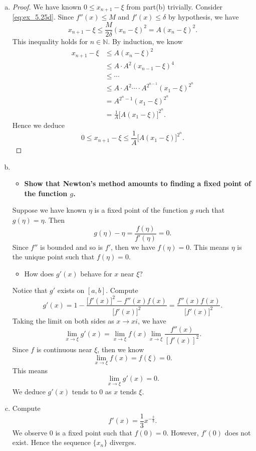 \begin{Exercise}
\begin{enumerate}[(a)]
		\item
		\begin{proof}
			We have known $0 \leq x_{n+1} - \xi$ from part(b) trivially.
			Consider \eqref{eq:ex_5.25d}.
			Since $f''(x) \leq M$ and $f'(x) \leq \delta$ by hypothesis, we have
			$$
			x_{n+1}-\xi \leq \frac{M}{2\delta}(x_n-\xi)^2 = A(x_n-\xi)^2.
			$$
			This inequality holds for $n\in\mathbb{N}$. By induction, we know
			\begin{align*}
			x_{n+1}-\xi
			&\leq A(x_n-\xi)^2 \\
			&\leq A\cdot A^2 (x_{n-1}-\xi)^4 \\
			&\leq \cdots \\
			&\leq A\cdot A^2 \cdots \cdot A^{2^{n-1}} (x_1-\xi)^{2^n} \\
			&= A^{2^n-1} (x_1-\xi)^{2^n} \\
			&= \frac{1}{A} \big[A(x_1-\xi)\big]^{2^n}.
			\end{align*}
			Hence we deduce
			$$
			0 \leq x_{n+1}-\xi \leq \frac{1}{A} \big[A(x_1-\xi)\big]^{2^n}.
			$$
		\end{proof}
		
		\item
		\begin{itemize}
			\item \textbf{Show that Newton's method amounts to finding a fixed point of the function $g$.}
		\end{itemize}
		\begin{solution}
			Suppose we have known $\eta$ is a fixed point of the function $g$ such that $g(\eta) = \eta$. Then
			$$
			g(\eta) - \eta = \frac{f(\eta)}{f'(\eta)} = 0.
			$$
			Since $f''$ is bounded and so is $f'$, then we have $f(\eta) = 0$.
			This means $\eta$ is the unique point such that $f(\eta) = 0$.
		\end{solution}
		\begin{itemize}
			\item How does $g'(x)$ behave for $x$ near $\xi$?
		\end{itemize}
		\begin{solution}
			Notice that $g'$ exists on $[a,b]$. Compute
			$$
			g'(x) = 1 - \frac{\big[ f'(x) \big]^2 - f''(x) f(x)}{\big[ f'(x) \big]^2} = \frac{f''(x) f(x)}{\big[ f'(x) \big]^2}.
			$$
			Taking the limit on both sides as $x\to xi$, we have
			$$
			\lim_{x\to\xi}g'(x) = \lim_{x\to\xi}f(x) \lim_{x\to\xi} \frac{f''(x)}{[f'(x)]^2}.
			$$
			Since $f$ is continuous near $\xi$, then we know
			$$
			\lim_{x\to\xi} f(x) = f(\xi) = 0.
			$$
			This means
			$$
			\lim_{x\to\xi}g'(x) = 0.
			$$
			We deduce $g'(x)$ tends to $0$ as $x$ tends $\xi$.
		\end{solution}
		
		\item
		\begin{solution}
			Compute
			$$
			f'(x) = \frac{1}{3} x^{-\frac{2}{3}}.
			$$
			We observe $0$ is a fixed point such that $f(0) = 0$.
			However, $f'(0)$ does not exist.
			Hence the sequence $\{x_n\}$ diverges.
		\end{solution}
	\end{enumerate}
\end{Exercise}